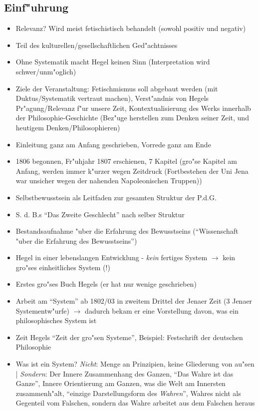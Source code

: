 \documentclass[emulatestandardclasses]{scrartcl}
\begin{document}
\subsection{Einf"uhrung}

\begin{itemize}
  \item Relevanz? Wird meist fetischistisch behandelt (sowohl positiv und negativ)
  \item Teil des kulturellen/gesellschaftlichen Ged"achtnisses
  \item Ohne Systematik macht Hegel keinen Sinn (Interpretation wird schwer/unm"oglich)
  \item Ziele der Veranstaltung: Fetischmismus soll abgebaut werden (mit Duktus/Systematik vertraut machen), Verst"andnis von Hegels Pr"agung/Relevanz f"ur unsere Zeit, Kontextualisierung des Werks innerhalb der Philosophie-Geschichte (Bez"uge herstellen zum Denken seiner Zeit, und heutigem Denken/Philosophieren)
  \item Einleitung ganz am Anfang geschrieben, Vorrede ganz am Ende
  \item 1806 begonnen, Fr"uhjahr 1807 erschienen, 7 Kapitel (gro"se Kapitel am Anfang, werden immer k"urzer wegen Zeitdruck (Fortbestehen der Uni Jena war unsicher wegen der nahenden Napoleonischen Truppen))
  \item Selbstbewusstsein als Leitfaden zur gesamten Struktur der P.d.G.
  \item S. d. B.s "`Das Zweite Geschlecht"' nach selber Struktur
  \item Bestandsaufnahme "uber die Erfahrung des Bewusstseins ("`Wissenschaft "uber die Erfahrung des Bewusstseins"')
  \item Hegel in einer lebenslangen Entwicklung - \emph{kein} fertiges System $\rightarrow$ kein gro"ses einheitliches System (!)
  \item Erstes gro"ses Buch Hegels (er hat nur wenige geschrieben)
  \item Arbeit am "`System"' ab 1802/03 in zweitem Drittel der Jenaer Zeit (3 Jenaer Systementw"urfe) $\rightarrow$ dadurch bekam er eine Vorstellung davon, was ein philosophisches System ist
  \item Zeit Hegels "`Zeit der gro"sen Systeme"', Beispiel: Festschrift der deutschen Philosophie
  \item Was ist ein System? \emph{Nicht}: Menge an Prinzipien, keine Gliederung von au"sen | \emph{Sondern}: Der Innere Zusammenhang des Ganzen, "`Das Wahre ist das Ganze"', Innere Orientierung am Ganzen, was die Welt am Innersten zusammenh"alt, "`einzige Darstellungsform des \emph{Wahren}"', Wahres nicht als Gegenteil vom Falschen, sondern das Wahre arbeitet aus dem Falschen heraus

\end{itemize}
\end{document}
